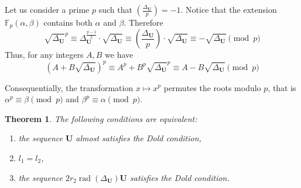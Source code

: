 \documentclass[preprint,12pt]{elsarticle}
\newcommand{\F}{\mathbb{F}}
\newcommand{\Li}[2]{\left(\frac{#1}{#2}\right)}
\DeclareMathOperator{\rad}{rad}
\newtheorem{theorem}{Theorem}
\begin{document}
Let us consider a prime $p$ such that $\Li{\Delta_{\mathbf U}}{p}= -1$. Notice that the extension $\F_p(\alpha, \beta)$ contains both $\alpha$ and $\beta$. Therefore
\[
    \sqrt{\Delta_{\mathbf U}}^p \equiv
    \Delta_{\mathbf U}^{\frac{p-1}{2}} \cdot \sqrt{\Delta_{\mathbf U}} \equiv 
    \Li{\Delta_{\mathbf U}}{p} \cdot \sqrt{\Delta_{\mathbf U}} \equiv
    -\sqrt{\Delta_{\mathbf U}} \pmod p
\]
Thus, for any integers $A,B$ we have
\[
    \left(A+B\sqrt{\Delta_{\mathbf U}}\right)^p \equiv
    A^p + B^p\sqrt{\Delta_{\mathbf U}}^p \equiv
    A - B\sqrt{\Delta_{\mathbf U}}
    \pmod{p}
\]

Consequentially, the transformation $x \mapsto x^p$ permutes the roots modulo $p$, that is $\alpha^p\equiv\beta\pmod p$ and $\beta^p \equiv \alpha\pmod p$.



\begin{theorem}\label{TheoremNotSquare}
    The following conditions are equivalent:
    \begin{enumerate}
        \itemsep-0.2em
        \item the sequence ${\mathbf U}$ almost satisfies the Dold condition, 
        \item $l_1=l_2$, 
        \item the sequence $2r_2\rad(\Delta_\mathbf{U}){\mathbf U}$ satisfies the Dold condition. 
    \end{enumerate}
\end{theorem}
\end{document}
